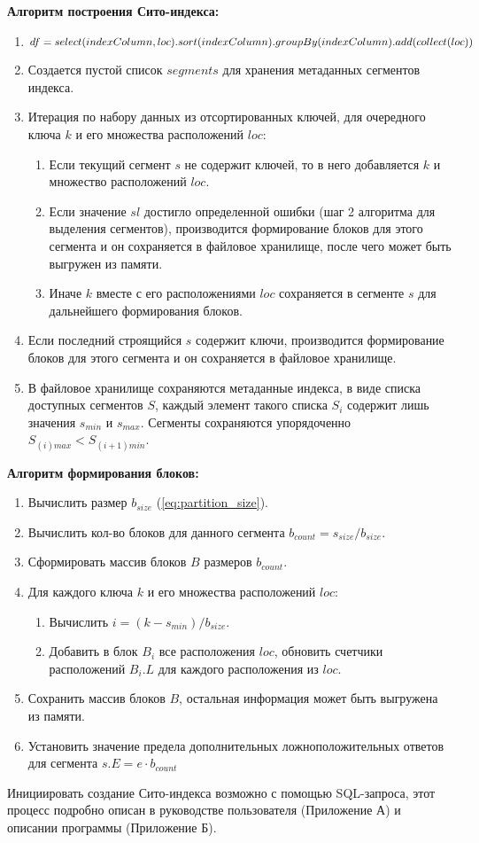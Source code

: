 \textbf{Алгоритм построения Сито-индекса:}
\begin{enumerate}
\item $df = select(indexColumn, loc).sort(indexColumn)\\.groupBy(indexColumn).add(collect(loc))$
\item Создается пустой список $segments$ для хранения метаданных сегментов индекса.
\item Итерация по набору данных из отсортированных ключей, для очередного ключа $k$ и его множества расположений $loc$:
    \begin{enumerate}
    \item Если текущий сегмент $s$ не содержит ключей, то в него добавляется $k$ и множество расположений $loc$.
    \item Если значение $sl$ достигло определенной ошибки (шаг 2 алгоритма для выделения сегментов), производится формирование блоков для этого сегмента и он сохраняется в файловое хранилище, после чего может быть выгружен из памяти.
    \item Иначе $k$ вместе с его расположениями $loc$ сохраняется в сегменте $s$ для дальнейшего формирования блоков.
    \end{enumerate}
\item Если последний строящийся $s$ содержит ключи, производится формирование блоков для этого сегмента и он сохраняется в файловое хранилище.
\item В файловое хранилище сохраняются метаданные индекса, в виде списка доступных сегментов $S$, каждый элемент такого списка $S_i$ содержит лишь значения $s_{min}$ и $s_{max}$. Сегменты сохраняются упорядоченно $S_{(i)max} < S_{(i+1)min}$.
\end{enumerate}

\textbf{Алгоритм формирования блоков:}
\begin{enumerate}
    \item Вычислить размер $b_{size}$ (\ref{eq:partition_size}).
    \item Вычислить кол-во блоков для данного сегмента $b_{count} = s_{size} / b_{size}$.
    \item Сформировать массив блоков $B$ размеров $b_{count}$.
    \item Для каждого ключа $k$ и его множества расположений $loc$: 
        \begin{enumerate}
        \item Вычислить $i = (k - s_{min}) / b_{size}$.
        \item Добавить в блок $B_{i}$ все расположения $loc$, обновить счетчики расположений $B_{i}.L$ для каждого расположения из $loc$.
        \end{enumerate}
    \item Сохранить массив блоков $B$, остальная информация может быть выгружена из памяти.
    \item Установить значение предела дополнительных ложноположительных ответов для сегмента $s.E = e \cdot b_{count}$
\end{enumerate}

Инициировать создание Сито-индекса возможно с помощью SQL-запроса, этот процесс подробно описан в руководстве пользователя (Приложение А) и описании программы (Приложение Б).